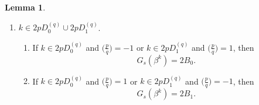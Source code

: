 \documentclass{mcom-l}
\theoremstyle{definition}
\newtheorem{sec3lemma8}[sec3lemma1]{Lemma}
\numberwithin{equation}{section}
\begin{document}
\begin{sec3lemma8}
\begin{enumerate}
\begin{enumerate}
     \begin{equation*}
     G_{s}(\beta^{k})=2A_{1}.
     \end{equation*}
     \end{enumerate}
     \item $ k\in 2pD_{0}^{(q)}\cup 2pD_{1}^{(q)} $.
     \begin{enumerate}
     \item
     If $ k\in 2pD_{0}^{(q)} $ and $ \bigl(\tfrac{p}{q}\bigr)=-1 $ or $ k\in 2pD_{1}^{(q)} $ and $ \bigl(\tfrac{p}{q}\bigr)=1 $, then
     \begin{equation*}
     G_{s}(\beta^{k})=2B_{0}.
     \end{equation*}
     \item
     If $ k\in 2pD_{0}^{(q)} $ and $ \bigl(\tfrac{p}{q}\bigr)=1 $ or $ k\in 2pD_{1}^{(q)} $ and $ \bigl(\tfrac{p}{q}\bigr)=-1 $, then
     \begin{equation*}
     G_{s}(\beta^{k})=2B_{1}.
     \end{equation*}
     \end{enumerate}
     \end{enumerate}
     \end{sec3lemma8}
\end{document}
